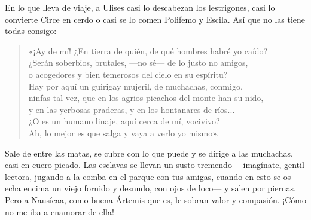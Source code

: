 En lo que lleva de viaje, a Ulises casi lo descabezan los lestrigones, casi lo convierte Circe en cerdo o casi se lo comen Polifemo y Escila. Así que no las tiene todas consigo:

\begin{verse}
«¡Ay de mí! ¿En tierra de quién, de qué hombres habré yo caído?\\
¿Serán soberbios, brutales, ---no sé--- de lo justo no amigos,\\
o acogedores y bien temerosos del cielo en su espíritu?\\
Hay por aquí un guirigay mujeril, de muchachas, conmigo,\\
ninfas tal vez, que en los agrios picachos del monte han su nido,\\
y en las yerbosas praderas, y en los hontanares de ríos...\\
¿O es un humano linaje, aquí cerca de mí, vocivivo?\\
Ah, lo mejor es que salga y vaya a verlo yo mismo».
\end{verse}

Sale de entre las matas, se cubre con lo que puede y se dirige a las muchachas, casi en cuero picado. Las esclavas se llevan un susto tremendo ---imagínate, gentil lectora, jugando a la comba en el parque con tus amigas, cuando en esto se os echa encima un viejo fornido y desnudo, con ojos de loco--- y salen por piernas. Pero a Nausícaa, como buena Ártemis que es, le sobran valor y compasión. ¡Cómo no me iba a enamorar de ella!

